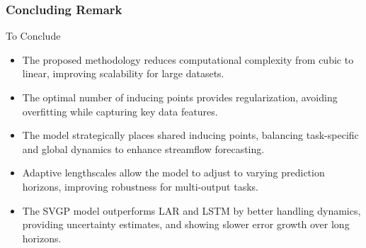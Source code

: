\subsubsection{Concluding Remark}
\begin{frame}{To Conclude} 
	\begin{itemize} 
		\item The proposed methodology reduces computational complexity from cubic to linear, improving scalability for large datasets. 
		\item The optimal number of inducing points provides regularization, avoiding overfitting while capturing key data features. 
		\item The model strategically places shared inducing points, balancing task-specific and global dynamics to enhance streamflow forecasting. 
		\item Adaptive lengthscales allow the model to adjust to varying prediction horizons, improving robustness for multi-output tasks. 
		\item The SVGP model outperforms LAR and LSTM by better handling dynamics, providing uncertainty estimates, and showing slower error growth over long horizons. \end{itemize}
	 \end{frame}
